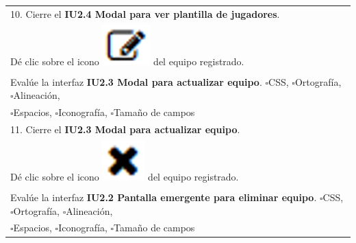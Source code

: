 \documentclass[oneside,10pt]{book}
\begin{document}
\begin{tabularx}{\textwidth}{ l l l X }
\multicolumn{1}{|l|}{10. Cierre el \textbf{IU2.4 Modal para ver plantilla de jugadores}.} & \multicolumn{1}{l|}{}   & \multicolumn{1}{l|}{}   & \multicolumn{1}{X|}{}              \\
\multicolumn{1}{|l|}{Dé clic sobre el icono \includegraphics[scale=.3]{images/edit} del equipo registrado.} & \multicolumn{1}{l|}{ } & \multicolumn{1}{l|}{ } & \multicolumn{1}{X|}{ } \\ 
\multicolumn{1}{|l|}{ } & \multicolumn{1}{l|}{ } & \multicolumn{1}{l|}{ } & \multicolumn{1}{X|}{ } \\ \hline
\multicolumn{4}{|l|}{Evalúe la interfaz \textbf{IU2.3 Modal para actualizar equipo}. $\square$CSS, $\square$Ortografía, $\square$Alineación,}                        \\
\multicolumn{4}{|l|}{$\square$Espacios, $\square$Iconografía, $\square$Tamaño de campos}                        \\ \hline

\multicolumn{1}{|l|}{11. Cierre el \textbf{IU2.3 Modal para actualizar equipo}.} & \multicolumn{1}{l|}{}   & \multicolumn{1}{l|}{}   & \multicolumn{1}{X|}{}              \\
\multicolumn{1}{|l|}{Dé clic sobre el icono \includegraphics[scale=.3]{images/eliminate} del equipo registrado.} & \multicolumn{1}{l|}{ } & \multicolumn{1}{l|}{ } & \multicolumn{1}{X|}{ } \\ 
\multicolumn{1}{|l|}{ } & \multicolumn{1}{l|}{ } & \multicolumn{1}{l|}{ } & \multicolumn{1}{X|}{ } \\ \hline
\multicolumn{4}{|l|}{Evalúe la interfaz \textbf{IU2.2 Pantalla emergente para eliminar equipo}. $\square$CSS, $\square$Ortografía, $\square$Alineación,}                        \\
\multicolumn{4}{|l|}{$\square$Espacios, $\square$Iconografía, $\square$Tamaño de campos}                        \\ \hline
\end{tabularx}
\end{document}

